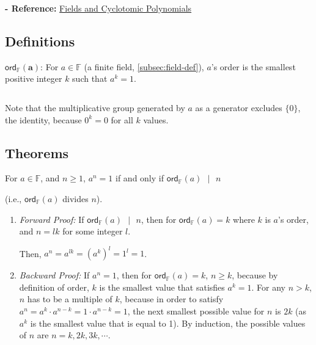 \textbf{- Reference:} 
\href{https://e.math.cornell.edu/people/belk/numbertheory/CyclotomicPolynomials.pdf}{Fields and Cyclotomic Polynomials}~\cite{cyclotomic-polynomial}

\subsection{Definitions}
\label{subsec:order-def}

\begin{tcolorbox}[title={\textbf{\tboxdef{\ref*{subsec:order-def}} Order Definition}}]
$\bm{\textsf{ord}_\mathbb{F}(a)}$: For $a \in \mathbb{F}$ (a finite field, \autoref{subsec:field-def}), $a$'s order is the smallest positive integer $k$ such that $a^k = 1$. 

$ $


\end{tcolorbox}

Note that the multiplicative group generated by $a$ as a generator excludes $\{0\}$, the identity, because $0^k = 0$ for all $k$ values.

\subsection{Theorems}
\label{subsec:order-theorem}



\begin{tcolorbox}[title={\textbf{\tboxtheorem{\ref*{subsec:order-theorem}.1} Order Property (I)}}]
For $a \in \mathbb{F}$, and $n \geq 1$, $a^n = 1$ if and only if $\textsf{ord}_\mathbb{F}(a) \text{ } | \text{ } n$ 

(i.e., $\textsf{ord}_\mathbb{F}(a)$ divides $n$).
\end{tcolorbox}

\begin{myproof}
    \begin{enumerate}
    \item \textit{Forward Proof:} If $\textsf{ord}_\mathbb{F}(a) \text{ } | \text{ } n$, then for $\textsf{ord}_\mathbb{F}(a) = k$ where $k$ is $a$'s order, and $n = lk$ for some integer $l$. 
    
    Then, $a^n = a^{lk} = (a^k)^l = 1^l = 1$.
    \item \textit{Backward Proof:} If $a^n = 1$, then for $\textsf{ord}_\mathbb{F}(a) = k$, $n \geq k$, because by definition of order, $k$ is the smallest value that satisfies $a^k = 1$. For any $n > k$, $n$ has to be a multiple of $k$, because in order to satisfy $a^n = a^k \cdot a^{n - k} = 1 \cdot a^{n - k} = 1$, the next smallest possible value for $n$ is $2k$ (as $a^k$ is the smallest value that is equal to 1). By induction, the possible values of $n$ are $n = k, 2k, 3k, \cdots$.
    \end{enumerate}
\end{myproof}


